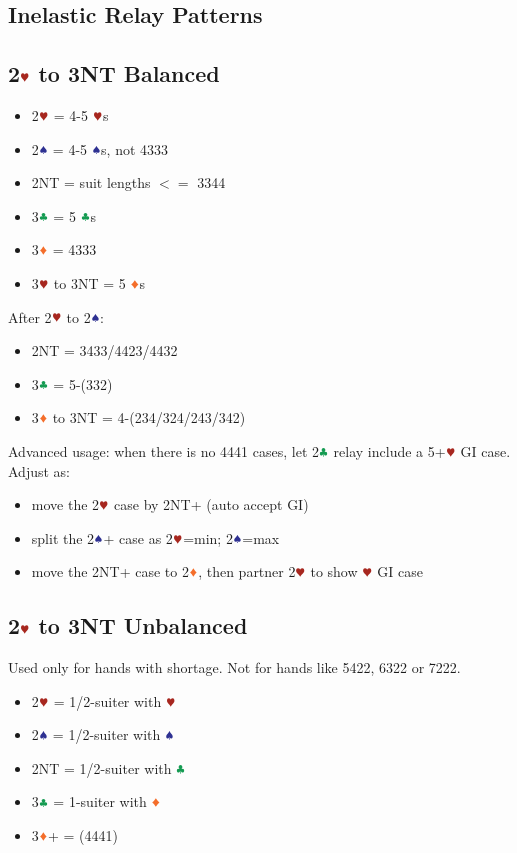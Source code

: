 \documentclass{article}
\begin{document}
\begin{multicols}{2}
\section{Inelastic Relay Patterns}

\subsection{2$\hhh$ to 3NT Balanced}
\label{sec:2h-3nt-bal}

\begin{itemize}
    \item 2$\hhh$ = 4-5 $\hhh$s
    \item 2$\sss$ = 4-5 $\sss$s, not 4333
    \item 2NT = suit lengths $<=$ 3344
    \item 3$\ccc$ = 5 $\ccc$s
    \item 3$\ddd$ = 4333
    \item 3$\hhh$ to 3NT = 5 $\ddd$s
\end{itemize}

\noindent After 2$\hhh$ to 2$\sss$:
\begin{itemize}
    \item 2NT = 3433/4423/4432
    \item 3$\ccc$ = 5-(332)
    \item 3$\ddd$ to 3NT = 4-(234/324/243/342)
\end{itemize}

\noindent Advanced usage: when there is no 4441 cases, let 2$\ccc$ relay include a 5+$\hhh$ GI case. Adjust as:
\begin{itemize}
    \item move the 2$\hhh$ case by 2NT+ (auto accept GI)
    \item split the 2$\sss$+ case as 2$\hhh$=min; 2$\sss$=max
    \item move the 2NT+ case to 2$\ddd$, then partner 2$\hhh$ to show $\hhh$ GI case
\end{itemize}

\subsection{2$\hhh$ to 3NT Unbalanced}
\label{sec:2h-3nt-unbal}
Used only for hands with shortage. Not for hands like 5422, 6322 or 7222.

\begin{itemize}
    \item 2$\hhh$ = 1/2-suiter with $\hhh$
    \item 2$\sss$ = 1/2-suiter with $\sss$
    \item 2NT = 1/2-suiter with $\ccc$
    \item 3$\ccc$ = 1-suiter with $\ddd$
    \item 3$\ddd$+ = (4441)
\end{itemize}


\end{multicols}
\end{document}
